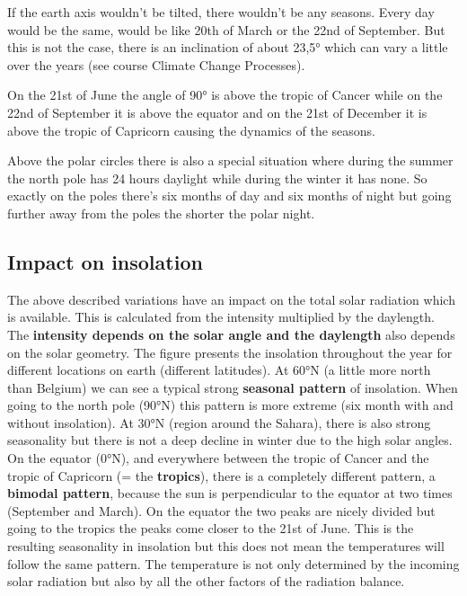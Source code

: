 \documentclass[oneside]{book}
\begin{document}
If the earth axis wouldn't be tilted, there wouldn't be any seasons.
Every day would be the same, would be like 20th of March or the 22nd of
September. But this is not the case, there is an inclination of about
23,5° which can vary a little over the years (see course Climate Change
Processes).

On the 21st of June the angle of 90° is above the tropic of Cancer while
on the 22nd of September it is above the equator and on the 21st of
December it is above the tropic of Capricorn causing the dynamics of the
seasons.

Above the polar circles there is also a special situation where during
the summer the north pole has 24 hours daylight while during the winter
it has none. So exactly on the poles there's six months of day and six
months of night but going further away from the poles the shorter the
polar night.

\subsection{Impact on insolation}\label{impact-on-insolation}

The above described variations have an impact on the total solar
radiation which is available. This is calculated from the intensity
multiplied by the daylength. The \textbf{intensity depends on the solar
angle and the daylength} also depends on the solar geometry. The figure
presents the insolation throughout the year for different locations on
earth (different latitudes). At 60°N (a little more north than Belgium)
we can see a typical strong \textbf{seasonal pattern} of insolation.
When going to the north pole (90°N) this pattern is more extreme (six
month with and without insolation). At 30°N (region around the Sahara),
there is also strong seasonality but there is not a deep decline in
winter due to the high solar angles. On the equator (0°N), and
everywhere between the tropic of Cancer and the tropic of Capricorn (=
the \textbf{tropics}), there is a completely different pattern, a
\textbf{bimodal pattern}, because the sun is perpendicular to the
equator at two times (September and March). On the equator the two peaks
are nicely divided but going to the tropics the peaks come closer to the
21st of June. This is the resulting seasonality in insolation but this
does not mean the temperatures will follow the same pattern. The
temperature is not only determined by the incoming solar radiation but
also by all the other factors of the radiation balance.
\end{document}
